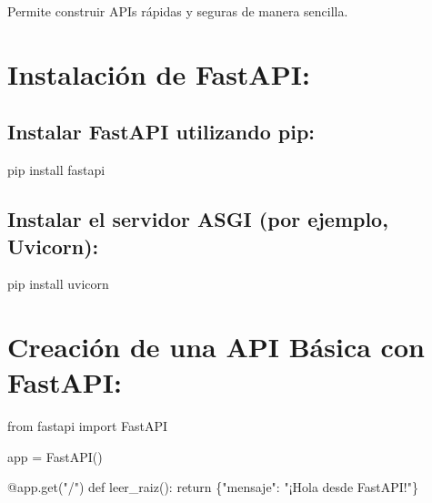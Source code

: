 \documentclass[
  a4paper,
  onepage,
  openany]{scrreprt}
\newenvironment{Shaded}{\begin{snugshade}}{\end{snugshade}}
\newcommand{\AttributeTok}[1]{\textcolor[rgb]{0.40,0.45,0.13}{#1}}
\newcommand{\ControlFlowTok}[1]{\textcolor[rgb]{0.00,0.23,0.31}{#1}}
\newcommand{\ExtensionTok}[1]{\textcolor[rgb]{0.00,0.23,0.31}{#1}}
\newcommand{\ImportTok}[1]{\textcolor[rgb]{0.00,0.46,0.62}{#1}}
\newcommand{\KeywordTok}[1]{\textcolor[rgb]{0.00,0.23,0.31}{#1}}
\newcommand{\NormalTok}[1]{\textcolor[rgb]{0.00,0.23,0.31}{#1}}
\newcommand{\OperatorTok}[1]{\textcolor[rgb]{0.37,0.37,0.37}{#1}}
\newcommand{\StringTok}[1]{\textcolor[rgb]{0.13,0.47,0.30}{#1}}
\begin{document}
Permite construir APIs rápidas y seguras de manera sencilla.

\hypertarget{instalaciuxf3n-de-fastapi}{%
\section{Instalación de FastAPI:}\label{instalaciuxf3n-de-fastapi}}

\hypertarget{instalar-fastapi-utilizando-pip}{%
\subsection{Instalar FastAPI utilizando
pip:}\label{instalar-fastapi-utilizando-pip}}

\begin{Shaded}
\begin{Highlighting}[]
\ExtensionTok{pip}\NormalTok{ install fastapi}
\end{Highlighting}
\end{Shaded}

\hypertarget{instalar-el-servidor-asgi-por-ejemplo-uvicorn}{%
\subsection{Instalar el servidor ASGI (por ejemplo,
Uvicorn):}\label{instalar-el-servidor-asgi-por-ejemplo-uvicorn}}

\begin{Shaded}
\begin{Highlighting}[]
\ExtensionTok{pip}\NormalTok{ install uvicorn}
\end{Highlighting}
\end{Shaded}

\hypertarget{creaciuxf3n-de-una-api-buxe1sica-con-fastapi}{%
\section{Creación de una API Básica con
FastAPI:}\label{creaciuxf3n-de-una-api-buxe1sica-con-fastapi}}

\begin{Shaded}
\begin{Highlighting}[]
\ImportTok{from}\NormalTok{ fastapi }\ImportTok{import}\NormalTok{ FastAPI}

\NormalTok{app }\OperatorTok{=}\NormalTok{ FastAPI()}

\AttributeTok{@app.get}\NormalTok{(}\StringTok{"/"}\NormalTok{)}
\KeywordTok{def}\NormalTok{ leer\_raiz():}
    \ControlFlowTok{return}\NormalTok{ \{}\StringTok{"mensaje"}\NormalTok{: }\StringTok{"¡Hola desde FastAPI!"}\NormalTok{\}}
\end{Highlighting}
\end{Shaded}
\end{document}
